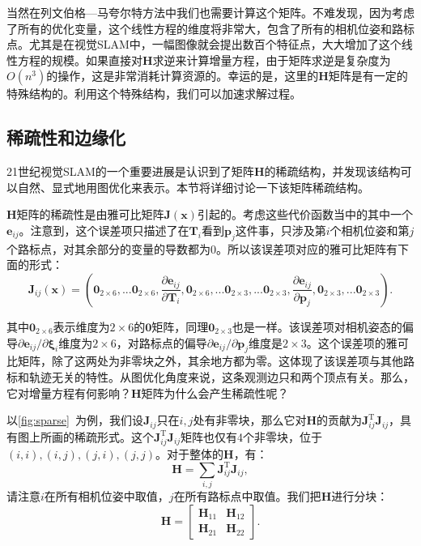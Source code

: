 当然在列文伯格—马夸尔特方法中我们也需要计算这个矩阵。不难发现，因为考虑了所有的优化变量，这个线性方程的维度将非常大，包含了所有的相机位姿和路标点。尤其是在视觉SLAM中，一幅图像就会提出数百个特征点，大大增加了这个线性方程的规模。如果直接对$\bm{H}$求逆来计算增量方程，由于矩阵求逆是复杂度为$O(n^3)$的操作\textsuperscript{\cite{Sueli2003}}，这是非常消耗计算资源的。幸运的是，这里的$\bm{H}$矩阵是有一定的特殊结构的。利用这个特殊结构，我们可以加速求解过程。

\subsection{稀疏性和边缘化}
21世纪视觉SLAM的一个重要进展是认识到了矩阵$\bm{H}$的稀疏结构，并发现该结构可以自然、显式地用图优化来表示\textsuperscript{\cite{Kummerle2011, Polok2013}}。本节将详细讨论一下该矩阵稀疏结构。

$\bm{H}$矩阵的稀疏性是由雅可比矩阵$\bm{J}(\bm{x})$引起的。考虑这些代价函数当中的其中一个$\bm{e}_{ij}$。注意到，这个误差项只描述了在$\bm{T}_i$看到$\bm{p}_j$这件事，只涉及第$i$个相机位姿和第$j$个路标点，对其余部分的变量的导数都为0。所以该误差项对应的雅可比矩阵有下面的形式：
\begin{equation}
\bm{J}_{ij}(\bm{x}) = \left(
\bm{0}_{2 \times 6},...
\bm{0}_{2 \times 6},
\frac{\partial \bm{e}_{ij}}{\partial \bm{T}_i},
\bm{0}_{2 \times 6},...
\bm{0}_{2 \times 3},...
\bm{0}_{2 \times 3},
\frac{\partial \bm{e}_{ij}}{ \partial \bm{p}_j},
\bm{0}_{2 \times 3},...
\bm{0}_{2 \times 3} 
\right) .
\end{equation}

其中$\bm{0}_{2 \times 6}$表示维度为$2 \times 6$的$\bm{0}$矩阵，同理$\bm{0}_{2 \times 3}$也是一样。该误差项对相机姿态的偏导${\partial \bm{e}_{ij}}/{\partial \bm{\xi}_i}$维度为$2 \times 6$，对路标点的偏导${\partial \bm{e}_{ij}}/{\partial \bm{p}_j}$维度是$2 \times 3$。这个误差项的雅可比矩阵，除了这两处为非零块之外，其余地方都为零。这体现了该误差项与其他路标和轨迹无关的特性。从图优化角度来说，这条观测边只和两个顶点有关。那么，它对增量方程有何影响？$\bm{H}$矩阵为什么会产生稀疏性呢？

以\autoref{fig:sparse}~为例，我们设$\bm{J}_{ij}$只在$i,j$处有非零块，那么它对$\bm{H}$的贡献为$\bm{J}_{ij}^\mathrm{T} \bm{J}_{ij}$，具有图上所画的稀疏形式。这个$\bm{J}_{ij}^\mathrm{T} \bm{J}_{ij}$矩阵也仅有4个非零块，位于$(i,i), (i,j), (j,i), (j,j)$。对于整体的$\bm{H}$，有：
\begin{equation}
\bm{H} = \sum_{i,j} \bm{J}_{ij}^\mathrm{T} \bm{J}_{ij},
\end{equation}
请注意$i$在所有相机位姿中取值，$j$在所有路标点中取值。我们把$\bm{H}$进行分块：
\begin{equation}
\label{eq:H-blocks}
\bm{H} = \left[ {\begin{array}{*{20}{c}}
	{{\bm{H}_{11}}}&{{\bm{H}_{12}}}\\
	{{\bm{H}_{21}}}&{{\bm{H}_{22}}}
	\end{array}} \right] .
\end{equation}

